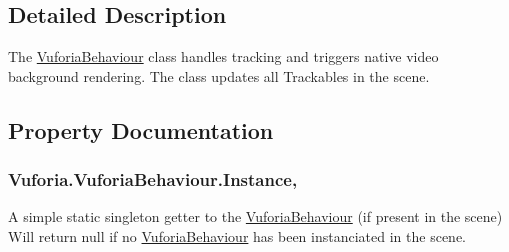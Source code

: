 \subsection{Detailed Description}
The \hyperlink{class_vuforia_1_1_vuforia_behaviour}{Vuforia\+Behaviour} class handles tracking and triggers native video background rendering. The class updates all Trackables in the scene. 



\subsection{Property Documentation}
\hypertarget{class_vuforia_1_1_vuforia_behaviour_abc8283fe39991709ed508253e995f9a1_abc8283fe39991709ed508253e995f9a1}{}
\subsubsection[{Instance}]{ Vuforia.\+Vuforia\+Behaviour.\+Instance\hspace{0.3cm}{\ttfamily [static]}, {\ttfamily [get]}}\label{class_vuforia_1_1_vuforia_behaviour_abc8283fe39991709ed508253e995f9a1_abc8283fe39991709ed508253e995f9a1}


A simple static singleton getter to the \hyperlink{class_vuforia_1_1_vuforia_behaviour}{Vuforia\+Behaviour} (if present in the scene) Will return null if no \hyperlink{class_vuforia_1_1_vuforia_behaviour}{Vuforia\+Behaviour} has been instanciated in the scene. 


